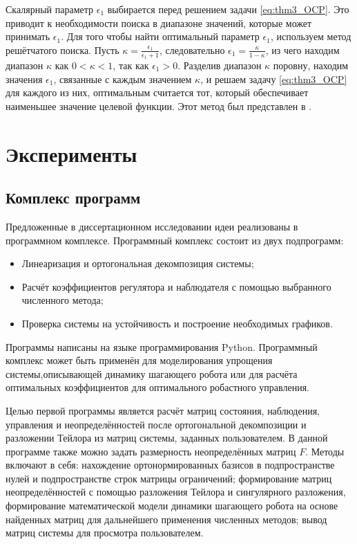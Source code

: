 Скалярный параметр $\epsilon_1$ выбирается перед решением задачи \eqref{eq:thm3_OCP}. Это приводит к необходимости поиска в диапазоне значений, которые может принимать $\epsilon_1$. Для того чтобы найти оптимальный параметр $\epsilon_1$, используем метод решётчатого поиска. Пусть $\kappa=\frac{\epsilon_1}{\epsilon_1+1}$, следовательно
$\epsilon_1=\frac{\kappa}{1-\kappa}$, из чего находим диапазон $\kappa$ как $0 < \kappa < 1$, так как $\epsilon_1 > 0$. Разделив диапазон $\kappa$ поровну, находим значения $\epsilon_1$, связанные с каждым значением $\kappa$, и решаем задачу \eqref{eq:thm3_OCP} для каждого из них, оптимальным считается тот, который обеспечивает наименьшее значение целевой функции. Этот метод был представлен в \cite{Li1997}.

\section{Эксперименты}\label{sec:ch3/sect3}
\subsection{Комплекс программ}\label{sec:ch3/sect3/sub1}

Предложенные в диссертационном исследовании идеи реализованы в программном комплексе. Программный комплекс состоит из двух подпрограмм:
\begin{itemize}
	\item Линеаризация и ортогональная декомпозиция системы;
	\item Расчёт коэффициентов регулятора и наблюдателя с помощью выбранного численного  метода;
	\item Проверка системы на устойчивость и построение необходимых графиков.
\end{itemize}

Программы написаны на языке программирования Python.  Программный комплекс может быть применён для моделирования упрощения системы,описывающей динамику шагающего робота или для расчёта оптимальных коэффициентов для оптимального робастного управления.

Целью первой программы является расчёт матриц состояния, наблюдения, управления и неопределённостей после ортогональной декомпозиции и разложении Тейлора из матриц системы, заданных пользователем. В данной программе также можно задать размерность неопределённых матриц $F$. Методы включают в себя: нахождение ортонормированных базисов в подпространстве нулей и подпространстве строк матрицы ограничений; формирование матриц неопределённостей с помощью разложения Тейлора и сингулярного разложения, формирование математической модели динамики шагающего робота на основе найденных матриц для дальнейшего применения численных методов; вывод матриц системы для просмотра пользователем.

